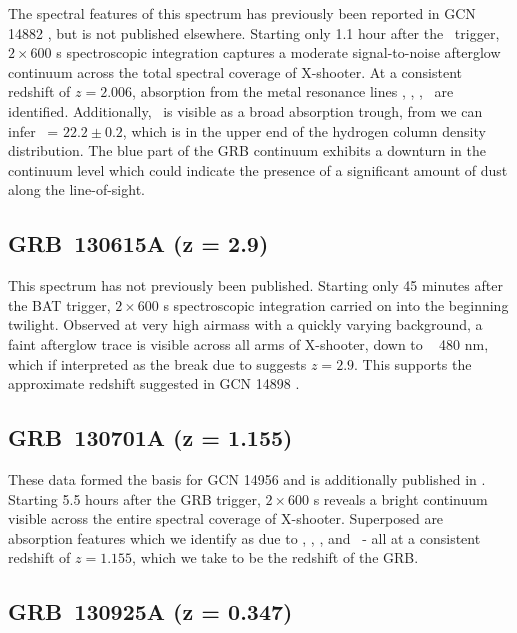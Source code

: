 \documentclass{aa}    %
\begin{document}
The spectral features of this spectrum has previously been reported in GCN 14882
\citep{GCN14882}, but is not published elsewhere. Starting only 1.1 hour after
the \swift~trigger, $2\times600$ s spectroscopic integration captures a moderate
signal-to-noise afterglow continuum across the total spectral coverage of
X-shooter. At a consistent redshift of $z = 2.006$, absorption from the metal
resonance lines \feii, \mnii, \mgii, \mgi~are identified. Additionally, \lya~is
visible as a broad absorption trough, from we can infer \nh~= $22.2 \pm 0.2$,
which is in the upper end of the hydrogen column density distribution. The blue
part of the GRB continuum exhibits a downturn in the continuum level which could
indicate the presence of a significant amount of dust along the line-of-sight.

\subsection{GRB~130615A (z = 2.9)} \label{130615}

This spectrum has not previously been published. Starting only 45 minutes after
the BAT trigger, $2\times600$ s spectroscopic integration carried on into the
beginning twilight. Observed at very high airmass with a quickly varying
background, a faint afterglow trace is visible across all arms of X-shooter,
down to ~ 480 nm, which if interpreted as the break due to \lya suggests $z =
2.9$. This supports the approximate redshift suggested in GCN 14898
\citep{GCN14898}.


\subsection{GRB~130701A (z = 1.155)}\label{130701}

These data formed the basis for GCN 14956 \citep{GCN14956} and is additionally
published in \citet{Kruhler2015}. Starting 5.5 hours after the GRB trigger,
$2\times600$ s reveals a bright continuum visible across the entire spectral
coverage of X-shooter. Superposed are absorption features which we identify as
due to \feii, \mgii, \mgi, and \caii~- all at a consistent redshift of $z =
1.155$, which we take to be the redshift of the GRB.



\subsection{GRB~130925A (z = 0.347)}\label{130925}
\end{document}
